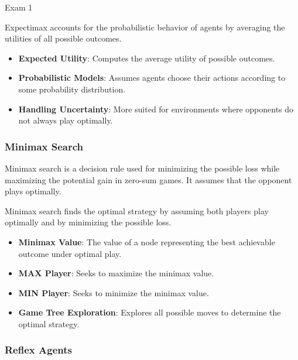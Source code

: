 \begin{examnotes}{Exam 1}
    \begin{highlight}[Expectimax]
        Expectimax accounts for the probabilistic behavior of agents by averaging the utilities of all possible outcomes.
        
        \begin{itemize}
            \item \textbf{Expected Utility}: Computes the average utility of possible outcomes.
            \item \textbf{Probabilistic Models}: Assumes agents choose their actions according to some probability distribution.
            \item \textbf{Handling Uncertainty}: More suited for environments where opponents do not always play optimally.
        \end{itemize}
    \end{highlight}
    
    \subsubsection*{Minimax Search}
    
    Minimax search is a decision rule used for minimizing the possible loss while maximizing the potential gain in zero-sum games. It assumes that the opponent plays optimally.
    
    \begin{highlight}
        Minimax search finds the optimal strategy by assuming both players play optimally and by minimizing the possible loss.
        
        \begin{itemize}
            \item \textbf{Minimax Value}: The value of a node representing the best achievable outcome under optimal play.
            \item \textbf{MAX Player}: Seeks to maximize the minimax value.
            \item \textbf{MIN Player}: Seeks to minimize the minimax value.
            \item \textbf{Game Tree Exploration}: Explores all possible moves to determine the optimal strategy.
        \end{itemize}
    \end{highlight}
    
    \subsubsection*{Reflex Agents}
    

\end{examnotes}
